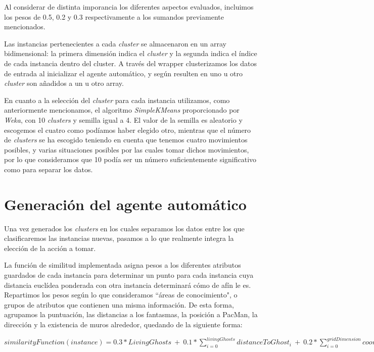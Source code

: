 \documentclass[12pt]{article}
\begin{document}
Al considerar de distinta imporancia los diferentes aspectos evaluados, incluimos los pesos de 0.5, 0.2 y 0.3 respectivamente a los sumandos previamente mencionados.


Las instancias pertenecientes a cada \emph{cluster} se almacenaron en un array bidimensional: la primera dimensión indica el \emph{cluster} y la segunda indica el índice de cada instancia dentro del cluster. A través del wrapper clusterizamos los datos de entrada al inicializar el agente automático, y según resulten en uno u otro \emph{cluster} son añadidos a un u otro array.


En cuanto a la selección del \emph{cluster} para cada instancia utilizamos, como anteriormente mencionamos, el algoritmo \emph{SimpleKMeans} proporcionado por \emph{Weka}, con 10 \emph{clusters} y semilla igual a 4. El valor de la semilla es aleatorio y escogemos el cuatro como podíamos haber elegido otro, mientras que el número de \emph{clusters} se ha escogido teniendo en cuenta que tenemos cuatro movimientos posibles, y varias situaciones posibles por las cuales tomar dichos movimientos, por lo que consideramos que 10 podía ser un número suficientemente significativo como para separar los datos.

\section{Generación del agente automático}

Una vez generados los \emph{clusters} en los cuales separamos los datos entre los que clasificaremos las instancias nuevas, pasamos a lo que realmente integra la elección de la acción a tomar.


La función de similitud implementada asigna pesos a los diferentes atributos guardados de cada instancia para determinar un punto para cada instancia cuya distancia euclídea ponderada con otra instancia determinará cómo de afín le es. Repartimos los pesos según lo que consideramos ``áreas de conocimiento", o grupos de atributos que contienen una misma información. De esta forma, agrupamos la puntuación, las distancias a los fantasmas, la posición a PacMan, la dirección y la existencia de muros alrededor, quedando de la siguiente forma:
\begin{center}
    $ similarityFunction(instance) = 0.3 * LivingGhosts\ +\ 0.1 * \sum\limits_{i = 0}^{livingGhosts} distanceToGhost_i\ +\ 0.2 * \sum\limits_{i = 0}^{gridDimension} coordinate_i\ +\ 0.1 * directionValue\ +\ 0.3 * \sum\limits_{i = 0}^{possibleWalls} thereIsWall_i $
\end{center}
\end{document}
